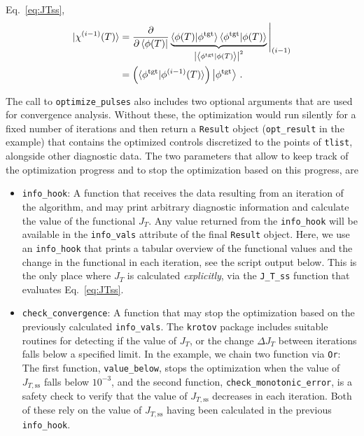 \documentclass[submission, Phys]{SciPost}
\newcommand{\tgt}[0]{\text{tgt}}
\renewcommand{\Braket}[2]{\left\langle{}#1\vphantom{#2}\mid{}#2\vphantom{#1}\right\rangle}
\newcommand{\Abs}[1]{\left\vert#1\right\vert}
\begin{document}
\begin{itemize}
      Eq.~\eqref{eq:JTss},
      \begin{equation}
      \begin{split}
        \ket{\chi^{(i-1)}(T)}
         &= \frac{\partial}{\partial \Bra{\phi(T)}}
             \underbrace{%
               \braket{\phi(T)|\phi^\tgt}
               \braket{\phi^\tgt|\phi(T)}
             }_{\Abs{\Braket{\phi^\tgt}{\phi(T)}}^2}
             \Bigg\vert_{(i-1)} \\
         &= \left(\braket{\phi^\tgt|\phi^{(i-1)}(T)}\right) \Ket{\phi^\tgt}\,.
      \end{split}
      \end{equation}
\end{itemize}

The call to \texttt{optimize\_pulses} also includes two optional arguments that
are used for convergence analysis.
Without these, the optimization would run silently for a fixed number of
iterations and then return a \texttt{Result} object (\texttt{opt\_result} in the
example) that contains the optimized controls discretized to the points of
\texttt{tlist}, alongside other diagnostic data.
The two parameters that allow to keep track of the optimization progress and to
stop the optimization based on this progress, are
\begin{itemize}
\item \texttt{info\_hook}: A function that receives the data resulting from an
iteration of the algorithm, and may print arbitrary diagnostic information and
calculate the value of the functional $J_T$.
Any value returned from the \texttt{info\_hook} will be available in the
\texttt{info\_vals} attribute of the final \texttt{Result} object.
Here, we use an \texttt{info\_hook} that prints a tabular overview of the
functional values and the change in the functional in each iteration, see the
script output below.
This is the only place where $J_T$ is calculated \emph{explicitly}, via the
\texttt{J\_T\_ss} function that evaluates Eq.~\eqref{eq:JTss}.
\item \texttt{check\_convergence}: A function that may stop the optimization
based on the previously calculated \texttt{info\_vals}.
The \texttt{krotov} package includes suitable routines for detecting if the
value of $J_T$, or the change $\Delta J_T$ between iterations falls below a
specified limit.
In the example, we chain two function via \texttt{Or}:
The first function, \texttt{value\_below}, stops the optimization when the value
of $J_{T,\text{ss}}$ falls below $10^{-3}$, and the second function,
\texttt{check\_monotonic\_error}, is a safety check to verify that the value of
$J_{T,\text{ss}}$ decreases in each iteration.
Both of these rely on the value of $J_{T,\text{ss}}$ having been calculated in
the previous \texttt{info\_hook}.
\end{itemize}
\end{document}
